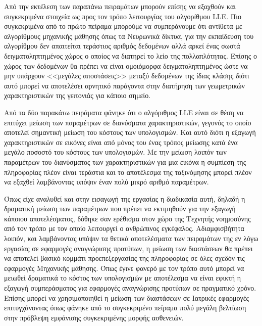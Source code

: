 \par
Από την εκτέλεση των παραπάνω πειραμάτων μπορούν επίσης να εξαχθούν και συγκεκριμένα στοιχεία ως προς τον τρόπο λειτουργίας του αλγορίθμου \textlatin{LLE}. Πιο συγκεκριμένα από το πρώτο πείραμα μπορούμε να συμπεράνουμε ότι αντίθετα με αλγορίθμους μηχανικής μάθησης όπως τα Νευρωνικά δίκτυα, για την εκπαίδευση του αλγορίθμου δεν απαιτείται τεράστιος αριθμός δεδομένων αλλά αρκεί ένας σωστά δειγματοληπτημένος χώρος ο οποίος να διατηρεί το λείο της πολλαπλότητας. Επίσης ο χώρος των δεδομένων θα πρέπει να είναι ομοιόμορφα δειγματοληπτημένος ώστε να μην υπάρχουν <<μεγάλες αποστάσεις>> μεταξύ δεδομένων της ίδιας κλάσης διότι αυτό μπορεί να αποτελέσει αρνητικό παράγοντα στην διατήρηση των γεωμετρικών χαρακτηριστικών της γειτονιάς για κάποιο σημείο.
\par
Από τα δύο παρακάτω πειράματα φάνηκε ότι ο αλγόριθμος \textlatin{LLE} είναι σε θέση να επιτύχει μείωση των παραμέτρων σε διανύσματα χαρακτηριστικών, γεγονός το οποίο αποτελεί σημαντική μείωση του κόστους των υπολογισμών. Και αυτό διότι η εξαγωγή χαρακτηριστικών σε εικόνες είναι από μόνος του ένας τρόπος μείωσης κατά ένα μεγάλο ποσοστό του κόστους των υπολογισμών. Με την μείωση λοιπόν των παραμέτρων του διανύσματος των χαρακτηριστικών για μια εικόνα η συμπίεση της πληροφορίας πλέον είναι τεράστια και το αποτέλεσμα της ταξινόμησης μπορεί πλέον να εξαχθεί λαμβάνοντας υπόψιν έναν πολύ μικρό αριθμό παραμέτρων. 
\par
Όπως είχε αναλυθεί και στην εισαγωγή της εργασίας η διαδικασία αυτή, δηλαδή η δραματική μείωση των παραμέτρων που πρέπει να εκτιμηθούν για την εξαγωγή κάποιου αποτελέσματος, δόθηκε σαν ερέθισμα στον χώρο της Τεχνητής νοημοσύνης από τον τρόπο με τον οποίο λειτουργεί ο ανθρώπινος εγκέφαλος. Αδιαμφισβήτητα λοιπόν, και λαμβάνοντας υπόψιν τα θετικά αποτελέσματα των πειραμάτων της εν λόγω εργασίας σε εφαρμογές αναγνώρισης προτύπων, η μείωση των διαστάσεων θα πρέπει να αποτελεί βασικό κομμάτι προεπεξεργασίας της πληροφορίας σε όλες σχεδόν τις εφαρμογές Μηχανικής μάθησης. Όπως έγινε φανερό με τον τρόπο αυτό μπορεί να μειωθεί δραματικά το κόστος των υπολογισμών με αποτέλεσμα να είναι εφικτή η εξαγωγή συμπεράσματος για εφαρμογές αναγνώρισης προτύπων σε πραγματικό χρόνο. Επίσης μπορεί να χρησιμοποιηθεί η μείωση των διαστάσεων σε Ιατρικές εφαρμογές επιτυγχάνοντας όπως φάνηκε από το συγκεκριμένο πείραμα πολύ μεγάλη βελτίωση στην πρόβλεψη εμφάνισης συγκεκριμένης μορφής ασθενειών.
\par

